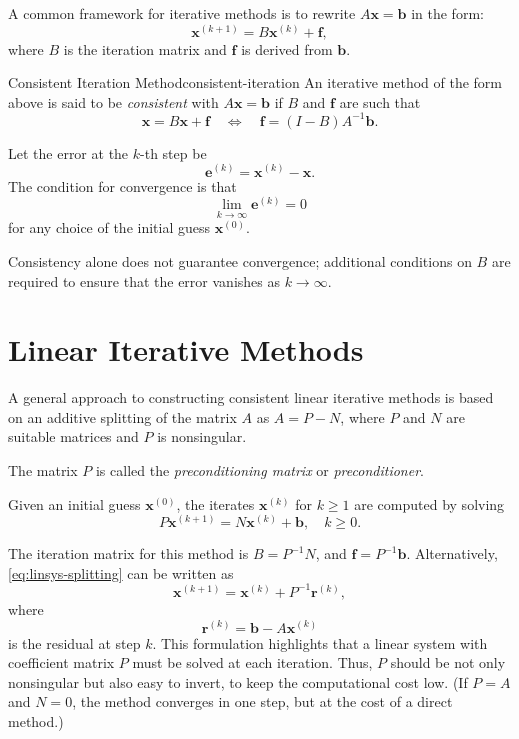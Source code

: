 A common framework for iterative methods is to rewrite \(A\mathbf{x} = \mathbf{b}\) in the form:
\[
    \mathbf{x}^{(k+1)} = B\mathbf{x}^{(k)} + \mathbf{f},
\]
where \(B\) is the iteration matrix and \(\mathbf{f}\) is derived from \(\mathbf{b}\).

\begin{definition}{Consistent Iteration Method}{consistent-iteration}
    An iterative method of the form above is said to be \emph{consistent} with \(A\mathbf{x} = \mathbf{b}\) if \(B\) and \(\mathbf{f}\) are such that
    \begin{equation}
        \mathbf{x} = B\mathbf{x} + \mathbf{f}
        \quad \Longleftrightarrow \quad
        \mathbf{f} = (I - B)A^{-1}\mathbf{b}.
    \end{equation}
\end{definition}

Let the error at the \(k\)-th step be
\begin{equation}
    \mathbf{e}^{(k)} = \mathbf{x}^{(k)} - \mathbf{x}.
\end{equation}
The condition for convergence is that
\[
    \lim_{k \to \infty} \mathbf{e}^{(k)} = 0
\]
for any choice of the initial guess \(\mathbf{x}^{(0)}\).

Consistency alone does not guarantee convergence; additional conditions on \(B\) are required to ensure that the error vanishes as \(k \to \infty\).

\section{Linear Iterative Methods}
A general approach to constructing consistent linear iterative methods is based on an additive splitting of the matrix \(A\) as \(A = P - N\), where \(P\) and \(N\) are suitable matrices and \(P\) is nonsingular.

The matrix \(P\) is called the \emph{preconditioning matrix} or \emph{preconditioner}.

Given an initial guess \(\mathbf{x}^{(0)}\), the iterates \(\mathbf{x}^{(k)}\) for \(k \geq 1\) are computed by solving
\begin{equation}
    P\mathbf{x}^{(k+1)} = N\mathbf{x}^{(k)} + \mathbf{b}, \quad k \geq 0. \label{eq:linsys-splitting}
\end{equation}

The iteration matrix for this method is \(B = P^{-1}N\), and \(\mathbf{f} = P^{-1}\mathbf{b}\). Alternatively, \eqref{eq:linsys-splitting} can be written as
\begin{equation}
    \mathbf{x}^{(k+1)} = \mathbf{x}^{(k)} + P^{-1}\mathbf{r}^{(k)},
    \label{eq:linsys-splitting-residual}
\end{equation}
where
\begin{equation}
    \mathbf{r}^{(k)} = \mathbf{b} - A\mathbf{x}^{(k)}
\end{equation}
is the residual at step \(k\).
This formulation highlights that a linear system with coefficient matrix \(P\) must be solved at each iteration. Thus, \(P\) should be not only nonsingular but also easy to invert, to keep the computational cost low.
(If \(P = A\) and \(N = 0\), the method converges in one step, but at the cost of a direct method.)


